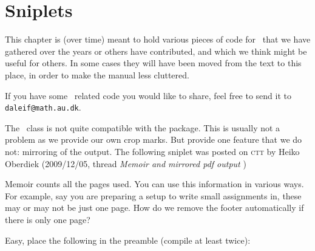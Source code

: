 

\chapter{Sniplets}
\label{cha:sniplets}



This chapter is (over time) meant to hold various pieces of code for
\theclass\ that we have gathered over the years or others have
contributed, and which we think might be useful for others.  In some
cases they will have been moved from the text to this place, in order
to make the manual less cluttered.


If you have some \theclass\ related code you would like to share, feel
free to send it to \verb?daleif@math.au.dk?.



\sniplettoc


\begin{sniplet}\label{snip:1}
  The \theclass\ class is not quite compatible with the 
  package. This is usually not a problem as we provide our own
  crop marks. But  provide one feature that we do not:
  mirroring of the output. The following sniplet was posted on
  \textsc{ctt} by Heiko Oberdiek (2009/12/05, thread \textit{
    Memoir and mirrored pdf output })
  \begin{lcode}
    \usepackage{atbegshi} 
    \usepackage{graphicx}
  \end{lcode}
\end{sniplet}

\begin{sniplet}\label{snip:2}
  Memoir counts all the pages used. You can use this information
  in various ways. For example, say you are preparing a setup to write
  small assignments in, these may or may not be just one page. How do
  we remove the footer automatically if there is only one page?

  Easy, place the following in the preamble (compile at least twice):
  \begin{lcode}
    \AtEndDocument{\ifnum\value{lastsheet}=1\thispagestyle{empty}\fi}
  \end{lcode}
\end{sniplet}

